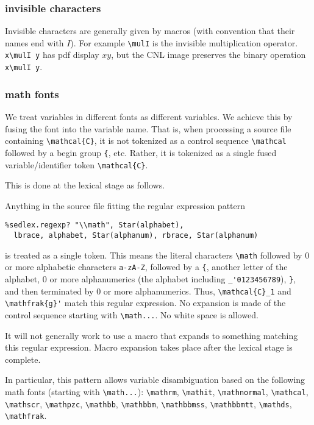 \documentclass[12pt]{amsart}
\begin{document}
\subsubsection{invisible characters}

Invisible characters are generally given by macros
(with convention that their names end with $I$).  For example
\verb!\mulI! is the invisible multiplication operator.
\verb!x\mulI y! has pdf display $x y$, but the CNL image
preserves the binary operation \verb!x\mulI y!.

\subsubsection{math fonts} 

We treat variables in different fonts as different variables.  We achieve this by fusing the font into the variable name.
That is, when processing a source file containing \verb!\mathcal{C}!, it is not tokenized as a control sequence \verb!\mathcal! followed by
a begin group \verb!{!, etc.  Rather, it is tokenized as a single fused variable/identifier token \verb!\mathcal{C}!.

This is done at the lexical stage as follows.

Anything in the source file fitting the regular expression pattern
\begin{Verbatim}
%sedlex.regexp? "\\math", Star(alphabet), 
  lbrace, alphabet, Star(alphanum), rbrace, Star(alphanum) 
\end{Verbatim}
is treated as a single token.  This means the literal characters \verb!\math! followed by 0 or more alphabetic characters \verb!a-zA-Z!,
followed by a \verb!{!, another letter of the alphabet, 0 or more alphanumerics (the alphabet including \verb!_'0123456789!), \verb!}!, and then
terminated by 0 or more alphanumerics.   Thus, \verb!\mathcal{C}_1! and \verb!\mathfrak{g}'! match this regular expression.
No expansion is made of the control sequence starting with \verb!\math...!.  No white space is allowed.  

It will not generally work to use
a macro that expands to something
matching this regular expression.  Macro expansion takes place after the lexical stage is complete.

In particular, this pattern allows variable disambiguation based on the following math fonts (starting with \verb!\math...!):
\verb!\mathrm!, \verb!\mathit!, \verb!\mathnormal!, 
\verb!\mathcal!, \verb!\mathscr!, \verb!\mathpzc!, 
\verb!\mathbb!, \verb!\mathbbm!, \verb!\mathbbmss!, 
\verb!\mathbbmtt!, \verb!\mathds!, \verb!\mathfrak!.
\end{document}
